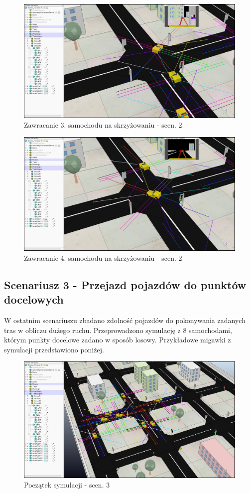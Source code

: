 \begin{figure}[!h]
	\centering
	\centering
	\includegraphics[width=.8\linewidth]{p24.jpg}
	\caption{Zawracanie 3. samochodu na skrzyżowaniu - scen. 2}
	\label{fig:p24}
\end{figure}

\begin{figure}[!h]
	\centering
	\centering
	\includegraphics[width=.8\linewidth]{p25.jpg}
	\caption{Zawracanie 4. samochodu na skrzyżowaniu - scen. 2}
	\label{fig:p25}
\end{figure}

\subsection{Scenariusz 3 - Przejazd pojazdów do punktów docelowych}
 
 W ostatnim scenariuszu zbadano zdolność pojazdów do pokonywania zadanych tras w obliczu dużego ruchu. Przeprowadzono symulację z 8 samochodami, którym punkty docelowe zadano w sposób losowy. Przykładowe migawki z symulacji przedstawiono poniżej.
 
 \begin{figure}[!h]
 	\centering
 	\centering
 	\includegraphics[width=.8\linewidth]{p31.jpg}
 	\caption{Początek symulacji - scen. 3}
 	\label{fig:p31}
 \end{figure}

